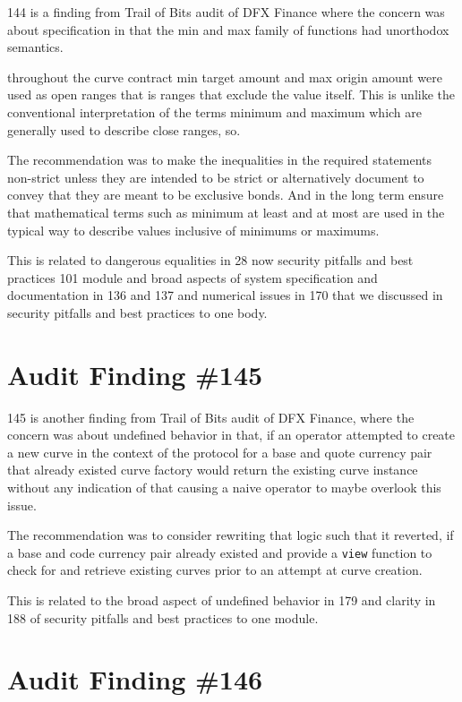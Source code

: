 144 is a finding from Trail of Bits audit of DFX Finance where the concern was about specification in that the min and max family of functions had unorthodox semantics.

throughout the curve contract min target amount and max origin amount were used as open ranges that is ranges that exclude the value itself. This is unlike the conventional interpretation of the terms minimum and maximum which are generally used to describe close ranges, so.

The recommendation was to make the inequalities in the required statements non-strict unless they are intended to be strict or alternatively document to convey that they are meant to be exclusive bonds. And in the long term ensure that mathematical terms such as minimum at least and at most are used in the typical way to describe values inclusive of minimums or maximums.

This is related to dangerous equalities in 28 now security pitfalls and best practices 101 module and broad aspects of system specification and documentation in 136 and 137 and numerical issues in 170 that we discussed in security pitfalls and best practices to one body.

\section{Audit Finding \#145}

145 is another finding from Trail of Bits audit of DFX Finance, where the concern was about undefined behavior in that, if an operator attempted to create a new curve in the context of the protocol for a base and quote currency pair that already existed curve factory would return the existing curve instance without any indication of that causing a naive operator to maybe overlook this issue.

The recommendation was to consider rewriting that logic such that it reverted, if a base and code currency pair already existed and provide a \verb|view| function to check for and retrieve existing curves prior to an attempt at curve creation.

This is related to the broad aspect of undefined behavior in 179 and clarity in 188 of security pitfalls and best practices to one module.

\section{Audit Finding \#146}

